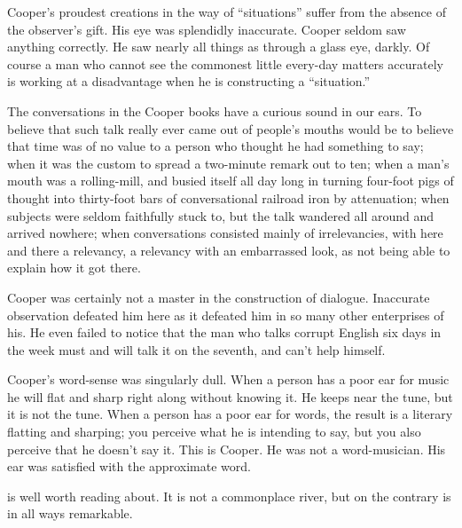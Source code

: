 \documentclass{novelette} %
\begin{document}
Cooper's proudest creations in the way of “situations” suffer
from the absence of the observer's gift. His eye was
splendidly inaccurate. Cooper seldom saw anything correctly. He saw
nearly all things as through a glass eye, darkly. Of course a man who
cannot see the commonest little every-day matters accurately is
working at a disadvantage when he is constructing a “situation.”

The conversations in the Cooper books have a curious sound in our
ears. To believe that such talk really ever came out of people's mouths
would be to believe that time was of no value to
a person who thought he had something to say; when it was the custom
to spread a two-minute remark out to ten; when a man's mouth was a
rolling-mill, and busied itself all day long in turning four-foot pigs
of thought into thirty-foot bars of conversational railroad iron by
attenuation; when subjects were seldom faithfully stuck to, but the talk
wandered all around and arrived nowhere; when conversations consisted
mainly of irrelevancies, with here and there a relevancy, a relevancy
with an embarrassed look, as not being able to explain how it got there.

Cooper was certainly not a master in the construction of dialogue.
Inaccurate observation defeated him here as it defeated him in so many
other enterprises of his. He even failed to notice that the man who
talks corrupt English six days in the week must and will talk it on
the seventh, and can't help himself.


Cooper's word-sense was singularly dull. When a person has a poor ear
for music he will flat and sharp right along without knowing it. He
keeps near the tune, but it is not the tune. When a person has a poor
ear for words, the result is a literary flatting and sharping; you
perceive what he is intending to say, but you also perceive that he
doesn't say it. This is Cooper. He was not a word-musician. His ear was
satisfied with the approximate word.



\begin{opening}
\null\null\null\null\null\null
{}
\null
{}
\null\null\null\null\null
\end{opening}

 is well worth reading about. It is not a
commonplace river, but on the contrary is in all ways remarkable.

\end{document}
